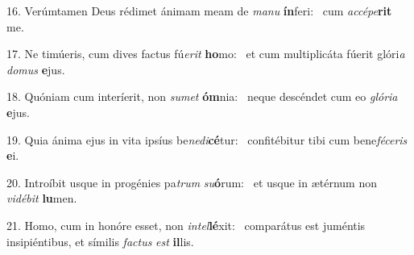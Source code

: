 16. Verúmtamen Deus rédimet ánimam meam de \textit{ma}\textit{nu} \textbf{ín}feri: \ast\  cum \textit{ac}\textit{cé}\textit{pe}\textbf{rit} me.\

17. Ne timúeris, cum dives factus fú\textit{e}\textit{rit} \textbf{ho}mo: \ast\  et cum multiplicáta fúerit glóri\textit{a} \textit{do}\textit{mus} \textbf{e}jus.\

18. Quóniam cum interíerit, non \textit{su}\textit{met} \textbf{óm}nia: \ast\  neque descéndet cum eo \textit{gló}\textit{ri}\textit{a} \textbf{e}jus.\

19. Quia ánima ejus in vita ipsíus be\textit{ne}\textit{di}\textbf{cé}tur: \ast\  confitébitur tibi cum bene\textit{fé}\textit{ce}\textit{ris} \textbf{e}i.\

20. Introíbit usque in progénies pa\textit{trum} \textit{su}\textbf{ó}rum: \ast\  et usque in ætérnum non \textit{vi}\textit{dé}\textit{bit} \textbf{lu}men.\

21. Homo, cum in honóre esset, non \textit{in}\textit{tel}\textbf{lé}xit: \ast\  comparátus est juméntis insipiéntibus, et símilis \textit{fac}\textit{tus} \textit{est} \textbf{il}lis.\

